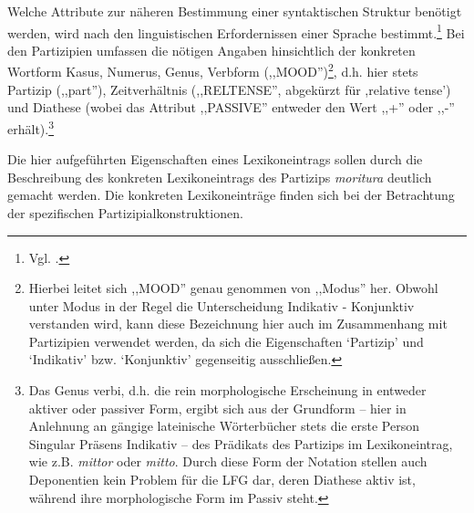 \documentclass[12pt,a4paper]{article}
\begin{document}
Welche Attribute zur näheren Bestimmung einer syntaktischen Struktur benötigt werden, wird nach den linguistischen Erfordernissen einer Sprache bestimmt.\footnote{Vgl. \cite[8]{Skript}.} Bei den Partizipien umfassen die nötigen Angaben hinsichtlich der konkreten Wortform Kasus, Numerus, Genus, Verbform (,,MOOD'')\footnote{Hierbei leitet sich ,,MOOD'' genau genommen von ,,Modus'' her. Obwohl unter Modus in der Regel die Unterscheidung Indikativ - Konjunktiv verstanden wird, kann diese Bezeichnung hier auch im Zusammenhang mit Partizipien verwendet werden, da sich die Eigenschaften `Partizip' und `Indikativ' bzw. `Konjunktiv' gegenseitig ausschließen.}, d.h. hier stets Partizip (,,part''), Zeitverhältnis (,,RELTENSE'', abgekürzt für ,relative tense') und Diathese (wobei das Attribut ,,PASSIVE'' entweder den Wert ,,+'' oder ,,-'' erhält).\footnote{Das Genus verbi, d.h. die rein morphologische Erscheinung in entweder aktiver oder passiver Form, ergibt sich aus der Grundform -- hier in Anlehnung an gängige lateinische Wörterbücher stets die erste Person Singular Präsens Indikativ -- des Prädikats des Partizips im Lexikoneintrag, wie z.B. \textit{mittor} oder \textit{mitto}. Durch diese Form der Notation stellen auch Deponentien kein Problem für die LFG dar, deren Diathese aktiv ist, während ihre morphologische Form im Passiv steht.}

Die hier aufgeführten Eigenschaften eines Lexikoneintrags sollen durch die Beschreibung des konkreten Lexikoneintrags des Partizips \textit{moritura} deutlich gemacht werden. Die konkreten Lexikoneinträge finden sich bei der Betrachtung der spezifischen Partizipialkonstruktionen.
\end{document}
